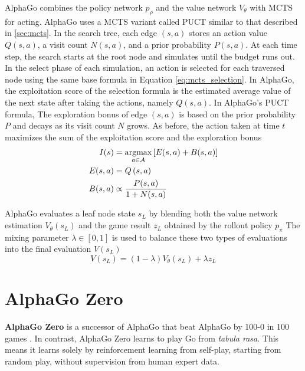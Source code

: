 AlphaGo combines the policy network $p_{\rho}$ and the value network $V_{\theta}$ with MCTS for acting.
AlphaGo uses a MCTS variant called PUCT similar to that described in \ref{sec:mcts}.
In the search tree, each edge $(s, a)$ stores an action value $Q(s, a)$, a visit count $N(s, a)$, and a prior probability $P(s, a)$.
At each time step, the search starts at the root node and simulates until the budget runs out.
In the select phase of each simulation, an action is selected for each traversed node using the same base formula in Equation \ref{eq:mcts_selection}.
In AlphaGo, the exploitation score of the selection formula is the estimated average value of the next state after taking the actions, namely $Q(s, a)$.
In AlphaGo's PUCT formula, The exploration bonus of edge $(s, a)$ is based on the prior probability $P$ and decays as its visit count $N$ grows.
As before, the action taken at time $t$ maximizes the sum of the exploitation score and the exploration bonus
\begin{align*}
    I(s)     & = \operatorname*{argmax}_{a \in \mathcal{A}}\left[ E(s, a)+B(s, a) \right]  \\
    E(s, a)  & = Q\left(s, a\right)  \\
    B(s, a)  & \propto \frac{P(s, a)}{1 + N(s, a)}  \\
\end{align*}

AlphaGo evaluates a leaf node state $s_L$ by blending both the value network estimation $V_\theta(s_L)$ and the game result $z_L$ obtained by the rollout policy $p_\pi$
The mixing parameter $\lambda \in [0, 1]$ is used to balance these two types of evaluations into the final evaluation $V(s_L)$
$$
    V\left(s_{L}\right)=(1-\lambda) V_{\theta}\left(s_{L}\right)+\lambda z_{L}
$$

\section{AlphaGo Zero}
\textbf{AlphaGo Zero} is a successor of AlphaGo that beat AlphaGo by 100-0 in 100 games \cite{MasteringGameGo_Silver.Schrittwieser.ea_2017}.
In contrast, AlphaGo Zero learns to play Go from \textit{tabula rasa}.
This means it learns solely by reinforcement learning from self-play, starting from random play, without supervision from human expert data.


